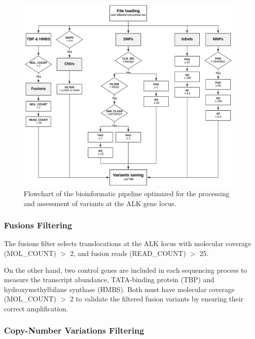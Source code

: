 \begin{figure}[ht]
    \centering
    \includegraphics[width=\textwidth]{Images/chapter_4/mut_filtering.png}
    \caption{Flowchart of the bioinformatic pipeline optimized for the processing and assessment of variants at the ALK gene locus.}
    \label{fig:Algorithm}
\end{figure}

\subsubsection{Fusions Filtering}

The fusions filter selects translocations at the ALK locus with molecular coverage (MOL\_COUNT) $>$ 2, and fusion reads (READ\_COUNT) $>$ 25.

On the other hand, two control genes are included in each sequencing process to measure the transcript abundance, TATA-binding protein (TBP) and hydroxymethylbilane synthase (HMBS). Both must have molecular coverage (MOL\_COUNT) $>$ 2 to validate the filtered fusion variants by ensuring their correct amplification.

\subsubsection{Copy-Number Variations Filtering}

